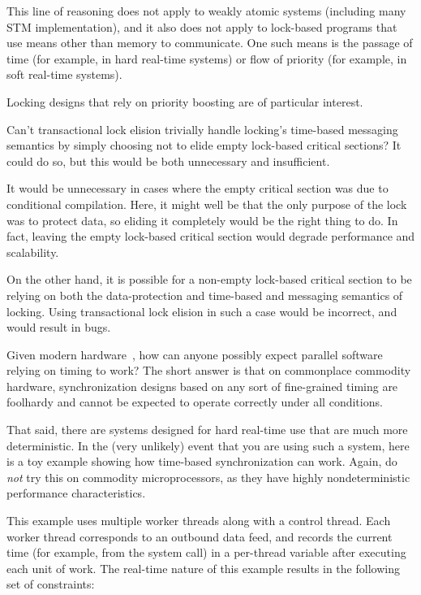 \begin{enumerate}
	This line of reasoning does not apply to weakly atomic
	systems (including many STM implementation), and it also
	does not apply to lock-based programs that use means other
	than memory to communicate.
	One such means is the passage of time (for example, in
	hard real-time systems) or flow of priority (for example,
	in soft real-time systems).

	Locking designs that rely on priority boosting are of particular
	interest.

\QuickQ{}
	Can't transactional lock elision trivially handle locking's
	time-based messaging semantics
	by simply choosing not to elide empty lock-based critical sections?
\QuickA{}
	It could do so, but this would be both unnecessary and
	insufficient.

	It would be unnecessary in cases where the empty critical section
	was due to conditional compilation.
	Here, it might well be that the only purpose of the lock was to
	protect data, so eliding it completely would be the right thing
	to do.
	In fact, leaving the empty lock-based critical section would
	degrade performance and scalability.

	On the other hand, it is possible for a non-empty lock-based
	critical section to be relying on both the data-protection
	and time-based and messaging semantics of locking.
	Using transactional lock elision in such a case would be
	incorrect, and would result in bugs.

\QuickQ{}
	Given modern hardware~\cite{PeterOkech2009InherentRandomness},
	how can anyone possibly expect parallel software relying
	on timing to work?
\QuickA{}
	The short answer is that on commonplace commodity hardware,
	synchronization designs based on any sort of fine-grained
	timing are foolhardy and cannot be expected to operate correctly
	under all conditions.

	That said, there are systems designed for hard real-time use
	that are much more deterministic.
	In the (very unlikely) event that you are using such a system,
	here is a toy example showing how time-based synchronization can
	work.
	Again, do \emph{not} try this on commodity microprocessors,
	as they have highly nondeterministic performance characteristics.

	This example uses multiple worker threads along with a control
	thread.
	Each worker thread corresponds to an outbound data feed, and
	records the current time (for example, from the
	 system call) in a per-thread
	 variable after executing each unit
	of work.
	The real-time nature of this example results in the following
	set of constraints:


\end{enumerate}
